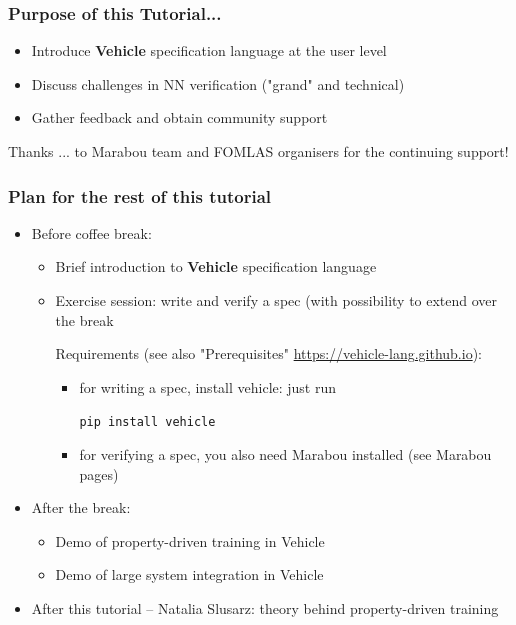 \documentclass{beamer}
\begin{document}
\begin{frame}
\frametitle{Purpose of this Tutorial...}

\begin{block}{}
\begin{itemize}
\item Introduce \textbf{Vehicle} specification language at the user level
\item Discuss challenges in NN verification ("grand" and technical)
\item Gather feedback and obtain community support
\end{itemize}
\end{block}

\begin{block}{Thanks}
... to Marabou team and FOMLAS organisers for the continuing support!
\end{block}
\end{frame}

\begin{frame}
\frametitle{Plan for the rest of this tutorial}

\begin{itemize}
\item Before coffee break:
\begin{itemize}
\item Brief introduction to \textbf{Vehicle} specification language 
\item \alert{Exercise session:} write and verify a spec (with possibility to extend over the break

Requirements (see also "Prerequisites" \url{https://vehicle-lang.github.io}): 

\begin{itemize}
\item for writing a spec, install vehicle: just run 

\texttt{pip install vehicle}

\item for verifying a spec, you also need Marabou installed (see Marabou pages)
\end{itemize}
\end{itemize}
\item After the break:
\begin{itemize}
\item Demo of property-driven training in Vehicle 
\item Demo of large system integration in Vehicle
\end{itemize}

\item After this tutorial -- Natalia Slusarz: theory behind property-driven training
\end{itemize}

\end{frame}
\end{document}
